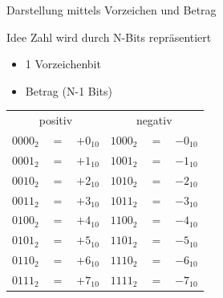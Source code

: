 \documentclass[xelatex,aspectratio=169]{beamer}
\begin{document}
\begin{frame}{Darstellung mittels Vorzeichen und Betrag}
  \begin{block}{Idee}
    Zahl wird durch N-Bits repräsentiert
    \begin{itemize}
      \item 1 Vorzeichenbit
      \item Betrag (N-1 Bits)
    \end{itemize}
  \end{block}
  \centering
  \begin{tabular}{rcrrcr}
    \toprule
    \multicolumn{3}{c}{positiv} & \multicolumn{3}{c}{negativ}                                            \\
    \cmidrule(lr){1-3} \cmidrule(lr){4-6}
    $0000_{2}$                  & $=$                         & $+0_{10}$ & $1000_{2}$ & $=$ & $-0_{10}$ \\
    $0001_{2}$                  & $=$                         & $+1_{10}$ & $1001_{2}$ & $=$ & $-1_{10}$ \\
    $0010_{2}$                  & $=$                         & $+2_{10}$ & $1010_{2}$ & $=$ & $-2_{10}$ \\
    $0011_{2}$                  & $=$                         & $+3_{10}$ & $1011_{2}$ & $=$ & $-3_{10}$ \\
    $0100_{2}$                  & $=$                         & $+4_{10}$ & $1100_{2}$ & $=$ & $-4_{10}$ \\
    $0101_{2}$                  & $=$                         & $+5_{10}$ & $1101_{2}$ & $=$ & $-5_{10}$ \\
    $0110_{2}$                  & $=$                         & $+6_{10}$ & $1110_{2}$ & $=$ & $-6_{10}$ \\
    $0111_{2}$                  & $=$                         & $+7_{10}$ & $1111_{2}$ & $=$ & $-7_{10}$ \\
    \bottomrule
  \end{tabular}
\end{frame}
\end{document}
